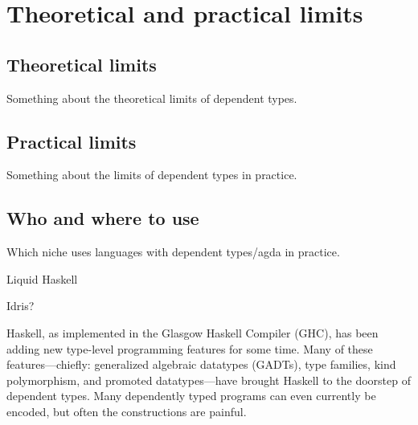 \section{Theoretical and practical limits}
\subsection{Theoretical limits}
Something about the theoretical limits of dependent types.
\subsection{Practical limits}
Something about the limits of dependent types in practice.
\subsection{Who and where to use}
Which niche uses languages with dependent types/agda in practice.

Liquid Haskell \cite{DBLP:journals/corr/abs-1711-03842, 10.1145/3299711.3242756}

Idris?

Haskell, as implemented in the Glasgow Haskell Compiler (GHC), has been adding new type-level programming features for some time. Many of these features---chiefly: generalized algebraic datatypes (GADTs), type families, kind polymorphism, and promoted datatypes---have brought Haskell to the doorstep of dependent types. Many dependently typed programs can even currently be encoded, but often the constructions are painful. \cite{DBLP:journals/corr/Eisenberg16}
